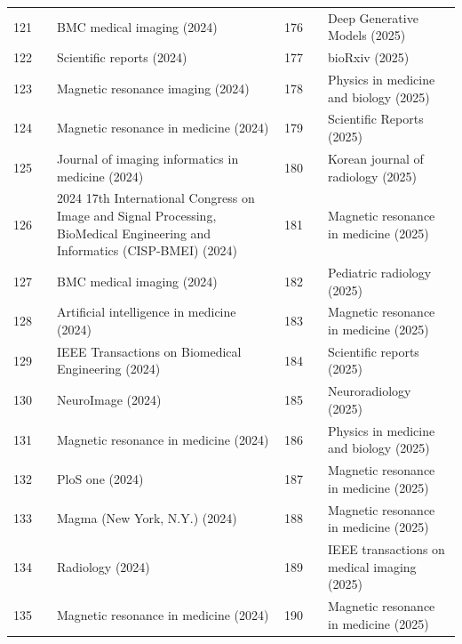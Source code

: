 \documentclass[11pt]{article}
\begin{document}
{\begin{longtable}{r l p{} r l p{}}
121 & \cite{karthik2024comprehensive} & BMC medical imaging (2024) & 176 & \cite{karl2025nonreference} & Deep Generative Models (2025) \\
122 & \cite{lee2024deep} & Scientific reports (2024) & 177 & \cite{chen2025pwgan} & bioRxiv (2025) \\
123 & \cite{uher2024deepflair} & Magnetic resonance imaging (2024) & 178 & \cite{li2025patientspecific} & Physics in medicine and biology (2025) \\
124 & \cite{bian2024improving} & Magnetic resonance in medicine (2024) & 179 & \cite{sepideh2025probabilistic} & Scientific Reports (2025) \\
125 & \cite{yasaka2024iterative} & Journal of imaging informatics in medicine (2024) & 180 & \cite{choi2025prospective} & Korean journal of radiology (2025) \\
126 & \cite{trivedi2024mcddpm} & 2024 17th International Congress on Image and Signal Processing, BioMedical Engineering and Informatics (CISP-BMEI) (2024) & 181 & \cite{jochmann2025quantitative} & Magnetic resonance in medicine (2025) \\
127 & \cite{ma2024mri} & BMC medical imaging (2024) & 182 & \cite{wichtmann2025rapid} & Pediatric radiology (2025) \\
128 & \cite{khawaled2024npbrec} & Artificial intelligence in medicine (2024) & 183 & \cite{wang2025rapid} & Magnetic resonance in medicine (2025) \\
129 & \cite{kofler2024quantitative} & IEEE Transactions on Biomedical Engineering (2024) & 184 & \cite{verdicchio2025reliability} & Scientific reports (2025) \\
130 & \cite{gil2024quantitative} & NeuroImage (2024) & 185 & \cite{jung2025reliability} & Neuroradiology (2025) \\
131 & \cite{qiu2024selfcalibrated} & Magnetic resonance in medicine (2024) & 186 & \cite{safari2025resmocodiff} & Physics in medicine and biology (2025) \\
132 & \cite{olsson2024simulating} & PloS one (2024) & 187 & \cite{aali2025robust} & Magnetic resonance in medicine (2025) \\
133 & \cite{rizzuti2024towards} & Magma (New York, N.Y.) (2024) & 188 & \cite{dong2025romerepti} & Magnetic resonance in medicine (2025) \\
134 & \cite{altmann2024ultrafast} & Radiology (2024) & 189 & \cite{dabrowski2025sismik} & IEEE transactions on medical imaging (2025) \\
135 & \cite{jun2024zerodeepsub} & Magnetic resonance in medicine (2024) & 190 & \cite{huber2025shortterm} & Magnetic resonance in medicine (2025) \\

\end{longtable}}
\end{document}
